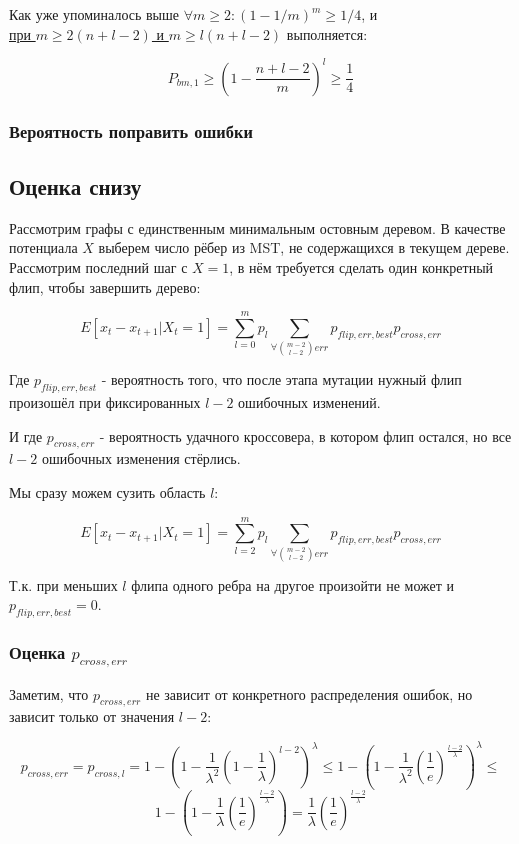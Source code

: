 \documentclass{article}
\begin{document}
Как уже упоминалось выше $\forall m \geq 2 : (1 - 1/m)^m \geq 1/4$, и \\  \underline{при $m \geq 2(n + l - 2)$  и $m \geq l (n + l - 2)$} выполняется:

$$
P_{bm,1} \geq
(1 - \frac{n + l - 2}{m})^l \geq 
\frac{1}{4}
$$

  \subsubsection{Вероятность поправить ошибки}



  \subsection{Оценка снизу}

Рассмотрим графы с единственным минимальным остовным деревом. В качестве потенциала $X$ выберем число рёбер из MST, не содержащихся в текущем дереве. Рассмотрим последний шаг с $X = 1$, в нём требуется сделать один конкретный флип, чтобы завершить дерево:

$$
E[x_t - x_{t+1} | X_t = 1] = \sum_{l=0}^{m} p_l \sum_{\forall \binom{m - 2}{l - 2} err} p_{flip, err, best} p_{cross, err}
$$

Где $p_{flip, err, best}$ - вероятность того, что после этапа мутации нужный флип произошёл при фиксированных $l - 2$ ошибочных изменений.

И где $p_{cross, err}$ - вероятность удачного кроссовера, в котором флип остался, но все $l - 2$ ошибочных изменения стёрлись.

Мы сразу можем сузить область $l$:

$$
E[x_t - x_{t+1} | X_t = 1] = \sum_{l=2}^{m} p_l \sum_{\forall \binom{m - 2}{l - 2} err} p_{flip, err, best} p_{cross, err}
$$

Т.к. при меньших $l$ флипа одного ребра на другое произойти не может и $p_{flip, err, best} = 0$.


  \subsubsection{Оценка $p_{cross, err}$}

Заметим, что $p_{cross, err}$ не зависит от конкретного распределения ошибок, но зависит только от значения $l - 2$:

$$
p_{cross, err} = p_{cross, l} = 
1 - (1 - \frac{1}{\lambda^2}(1 - \frac{1}{\lambda})^{l - 2})^\lambda \leq
1 - (1 - \frac{1}{\lambda^2}(\frac{1}{e})^\frac{l - 2}{\lambda})^\lambda \leq
$$
$$
1 - (1 - \frac{1}{\lambda}(\frac{1}{e})^\frac{l - 2}{\lambda}) =
\frac{1}{\lambda}(\frac{1}{e})^\frac{l - 2}{\lambda}
$$
\end{document}

